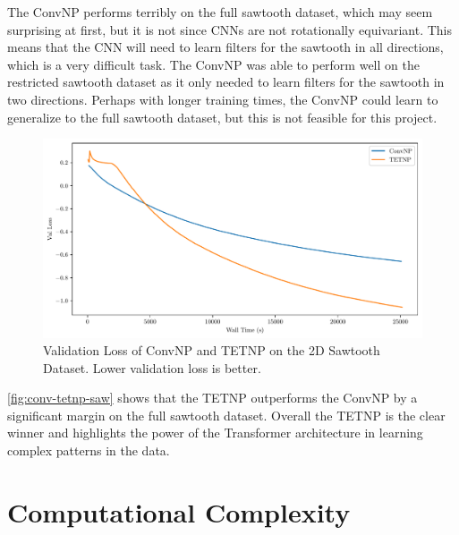 \documentclass[../../main.tex]{subfiles}
\begin{document}
The ConvNP performs terribly on the full sawtooth dataset, which may seem surprising at first, but it is not since CNNs are not rotationally equivariant. This means that the CNN will need to learn filters for the sawtooth in all directions, which is a very difficult task. The ConvNP was able to perform well on the restricted sawtooth dataset as it only needed to learn filters for the sawtooth in two directions. Perhaps with longer training times, the ConvNP could learn to generalize to the full sawtooth dataset, but this is not feasible for this project.



\begin{figure}[H]
    \centering
    \includegraphics[width=0.6\linewidth]{./fig/conv-tetnp-saw.pdf}
    \caption{Validation Loss of ConvNP and TETNP on the 2D Sawtooth Dataset. Lower validation loss is better.}
    \label{fig:conv-tetnp-saw}
\end{figure}

\autoref{fig:conv-tetnp-saw} shows that the TETNP outperforms the ConvNP by a significant margin on the full sawtooth dataset. Overall the TETNP is the clear winner and highlights the power of the Transformer architecture in learning complex patterns in the data.



\section{Computational Complexity}
\end{document}
